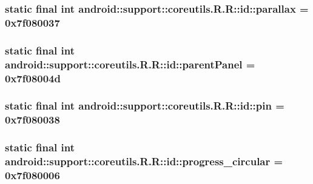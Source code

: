 \hypertarget{classandroid_1_1support_1_1coreutils_1_1_r_1_1id_54aa8f25a215a7613dcc0988ce1435cd}{
\subsubsection[{parallax}]{\setlength{\rightskip}{0pt plus 5cm}static final int android::support::coreutils.R.R::id::parallax = 0x7f080037}}
\label{classandroid_1_1support_1_1coreutils_1_1_r_1_1id_54aa8f25a215a7613dcc0988ce1435cd}


\hypertarget{classandroid_1_1support_1_1coreutils_1_1_r_1_1id_4f6c0d4e27422b9fbd5c66266b9ecfb3}{
\subsubsection[{parentPanel}]{\setlength{\rightskip}{0pt plus 5cm}static final int android::support::coreutils.R.R::id::parentPanel = 0x7f08004d}}
\label{classandroid_1_1support_1_1coreutils_1_1_r_1_1id_4f6c0d4e27422b9fbd5c66266b9ecfb3}


\hypertarget{classandroid_1_1support_1_1coreutils_1_1_r_1_1id_7205b72c64a3058a5373840692df8c75}{
\subsubsection[{pin}]{\setlength{\rightskip}{0pt plus 5cm}static final int android::support::coreutils.R.R::id::pin = 0x7f080038}}
\label{classandroid_1_1support_1_1coreutils_1_1_r_1_1id_7205b72c64a3058a5373840692df8c75}


\hypertarget{classandroid_1_1support_1_1coreutils_1_1_r_1_1id_caf87fd6ffca6eb064cc0f4057be1282}{
\subsubsection[{progress\_\-circular}]{\setlength{\rightskip}{0pt plus 5cm}static final int android::support::coreutils.R.R::id::progress\_\-circular = 0x7f080006}}
\label{classandroid_1_1support_1_1coreutils_1_1_r_1_1id_caf87fd6ffca6eb064cc0f4057be1282}


